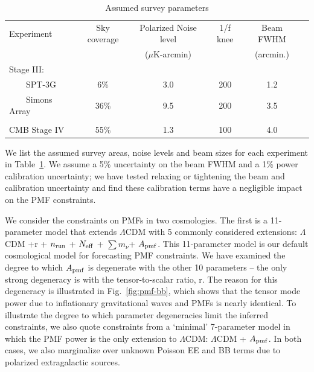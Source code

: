 \documentclass[apj]{emulateapj}
\newcommand{\apmf}{\ensuremath{A_{\rm pmf}}}
\newcommand{\lcdm}{\ensuremath{\Lambda}CDM}
\newcommand{\nrun}{\ensuremath{n_{\rm run}}}
\newcommand{\neff}{\ensuremath{N_{\rm eff}}}
\newcommand{\mnu}{\ensuremath{\sum m_\nu}}
\begin{document}
\begin{table}[tbh]
\begin{center}
\caption{\label{tab:experiments} Assumed survey parameters}
\small
\begin{tabular}{l || c c c c c }
Experiment & Sky coverage & Polarized Noise level  & 1/f knee & Beam FWHM \\
& &($\mu$K-arcmin)&&(arcmin.)\\
\hline
Stage III: & & & & \\

~~~~SPT-3G & 6\% & 3.0 & 200 & 1.2 \\
~~~~Simons Array & 36\% & 9.5 & 200 & 3.5 \\ 
\\
CMB Stage IV & 55\% & 1.3 & 100 & 4.0 \\
\end{tabular}
 \normalsize
\end{center}
\end{table}


We list the assumed survey areas, noise levels and beam sizes for each experiment in Table~\ref{tab:experiments}. 
We  assume a 5\% uncertainty on the beam FWHM and a 1\% power calibration uncertainty; we have tested relaxing or tightening the beam and calibration uncertainty and find these calibration terms have a negligible impact on the PMF constraints. 


We consider the constraints on PMFs in two cosmologies. 
The first is a 11-parameter model that extends \lcdm{} with 5 commonly considered extensions:  \lcdm{}  +r + \nrun{} + \neff{} + \mnu{}+ \apmf. 
This 11-parameter model is our default cosmological model for forecasting PMF constraints. 
We have examined the degree to which \apmf{} is degenerate with the other 10 parameters -- the only strong degeneracy is with the tensor-to-scalar ratio, r. 
The reason for this degeneracy is illustrated in Fig.~\ref{fig:pmf-bb}, which shows that the tensor mode power due to inflationary gravitational waves and PMFs is nearly identical. 
To illustrate the degree to which parameter degeneracies limit the inferred constraints,  we also quote constraints from a `minimal' 7-parameter model in which the PMF power is the only extension to \lcdm{}:  \lcdm{}  + \apmf. 
In both cases, we also marginalize over unknown Poisson EE and BB  terms due to polarized extragalactic sources. 
\end{document}
